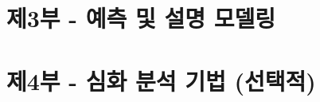 \documentclass[
  letterpaper,
]{book}
\begin{document}
\chapter{}\label{section-1}

\part{제3부 - 예측 및 설명 모델링}

\chapter{}\label{section-2}

\chapter{}\label{section-3}

\chapter{}\label{section-4}

\chapter{}\label{section-5}

\chapter{}\label{section-6}

\part{제4부 - 심화 분석 기법 (선택적)}

\chapter{}\label{section-7}

\chapter{}\label{section-8}

\chapter{}\label{section-9}

\chapter{}\label{section-10}
\end{document}
